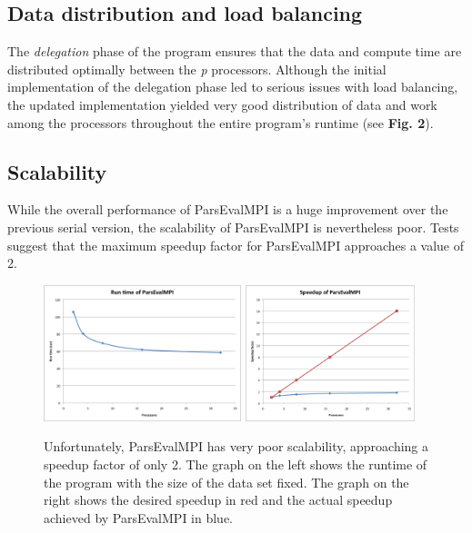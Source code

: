 \documentclass{bioinfo}
\begin{document}
\subsection*{Data distribution and load balancing}
The \textit{delegation} phase of the program ensures that the data and compute time are distributed optimally between the \textit{p} processors. Although the initial implementation of the delegation phase led to serious issues with load balancing, the updated implementation yielded very good distribution of data and work among the processors throughout the entire program's runtime (see \textbf{Fig. 2}).

\subsection*{Scalability}
While the overall performance of ParsEvalMPI is a huge improvement over the previous serial version, the scalability of ParsEvalMPI is nevertheless poor. Tests suggest that the maximum speedup factor for ParsEvalMPI approaches a value of 2.
\begin{figure}
  \begin{center}
    \includegraphics[height=150px]{runtime.png}
    \includegraphics[height=150px]{speedup.png}
  \end{center}
  \caption{Unfortunately, ParsEvalMPI has very poor scalability, approaching a speedup factor of only 2. The graph on the left shows the runtime of the program with the size of the data set fixed. The graph on the right shows the desired speedup in red and the actual speedup achieved by ParsEvalMPI in blue.}
\end{figure}
\end{document}

